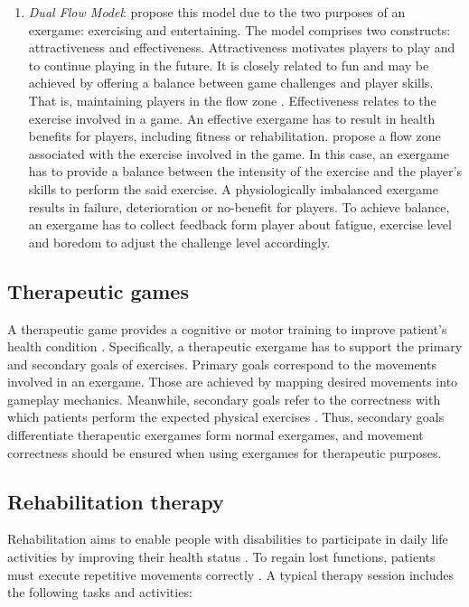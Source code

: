 \begin{enumerate}
    \item \emph{Dual Flow Model}: \textcite{Sinclair2007} propose this model due to the two purposes of an exergame: exercising and entertaining. The model comprises two constructs: attractiveness and effectiveness. Attractiveness motivates players to play and to continue playing in the future. It is closely related to fun and may be achieved by offering a balance between game challenges and player skills. That is, maintaining players in the flow zone \autocite{flow}.
    Effectiveness relates to the exercise involved in a game. An effective exergame has to result in health benefits for players, including fitness or rehabilitation. \citeauthor{Sinclair2007} propose a flow zone associated with the exercise involved in the game. In this case, an exergame has to provide a balance between the intensity of the exercise and the player's skills to perform the said exercise. A physiologically imbalanced exergame results in failure, deterioration or no-benefit for players. To achieve balance, an exergame has to collect feedback form player about fatigue, exercise level and boredom to adjust the challenge level accordingly.
\end{enumerate}

\subsection{Therapeutic games}
\label{sub:def_therapeutic_g}
A therapeutic game provides a cognitive or motor training to improve patient's health condition \autocite{Mader2012}. Specifically, a therapeutic exergame has to support the primary and secondary goals of exercises. Primary goals correspond to the movements involved in an exergame. Those are achieved by mapping desired movements into gameplay mechanics.  Meanwhile, secondary goals refer to the correctness with which patients perform the expected physical exercises \autocite{Pirovano2016}. Thus, secondary goals differentiate therapeutic exergames form normal exergames, and movement correctness should be ensured when using exergames for therapeutic purposes.

\subsection{Rehabilitation therapy}
\label{sub:def_rehab_therapy}
Rehabilitation aims to enable people with disabilities to participate in daily life activities by improving their health status \autocite{Wiemeyer2015}. To regain lost functions, patients must execute repetitive movements correctly \autocite{PirovanoAdvisor2012}. A typical therapy session includes the following tasks and activities:

